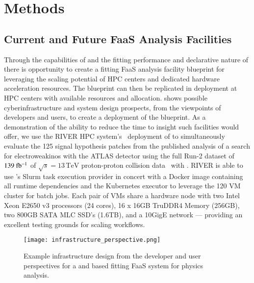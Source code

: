\section{Methods}\label{sec:methods}
%

%

%
\subsection{Current and Future FaaS Analysis Facilities}\label{subsec:FaaS_analysis_facilities}

Through the capabilities of \funcX{} and the fitting performance and declarative nature of \pyhf{} there is opportunity to create a fitting FaaS analysis facility blueprint for leveraging the scaling potential of HPC centers and dedicated hardware acceleration resources.
The blueprint can then be replicated in deployment at HPC centers with available resources and allocation.
 shows possible cyberinfrastructure and system design prospects, from the viewpoints of developers and users, to create a deployment of the blueprint.
As a demonstration of the ability to reduce the time to insight such facilities would offer, we use the RIVER HPC system's~\cite{RIVER_HPC} deployment of \funcX{} to simultaneously evaluate the 125 signal hypothesis patches from the published analysis of a search for electroweakinos with the ATLAS detector using the full Run-2 dataset of \(139~\ifb\) of \(\sqrt{s} = 13\,\text{TeV}\) proton-proton collision data~\cite{SUSY-2019-08} with \pyhf{}.
RIVER is able to use \funcX{}'s Slurm task execution provider in concert with a Docker image containing all runtime dependencies and the Kubernetes \funcX{} executor to leverage the 120 VM cluster for batch jobs.
Each pair of VMs share a hardware node with two Intel Xeon E2650 v3 processors (24 cores), 16 x 16GB TruDDR4 Memory (256GB), two 800GB SATA MLC SSD's (1.6TB), and a 10GigE network --- providing an excellent testing grounds for scaling workflows.

\begin{figure}[!htpb]
    \centering
    \texttt{[image: infrastructure\_perspective.png]}
    \caption{Example infrastructure design from the developer and user perspectives for a \pyhf{} and \funcX{} based fitting FaaS system for physics analysis.~\cite{portable_inference_workshop}}
    \label{fig:infrastructure_perspective}
\end{figure}

